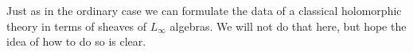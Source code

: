 \begin{rmk}
Just as in the ordinary case we can formulate the data of a classical holomorphic theory in terms of sheaves of $L_\infty$ algebras. 
We will not do that here, but hope the idea of how to do so is clear.
\end{rmk}

%
%
%
%
%

